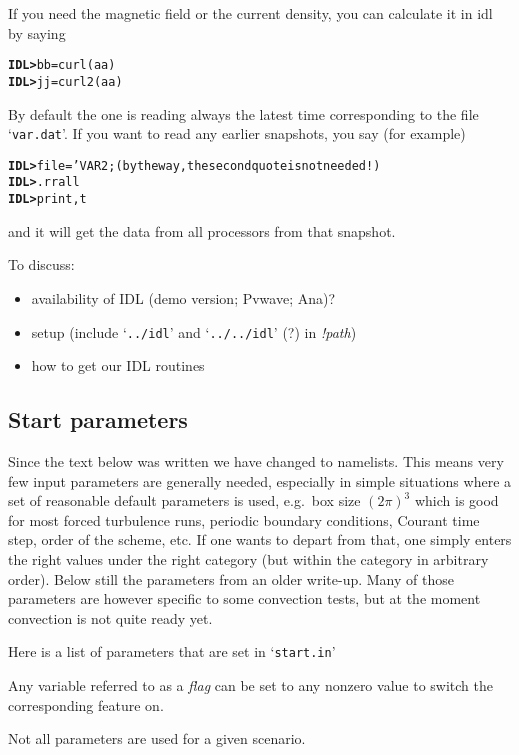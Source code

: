 \documentclass[12pt,twoside,notitlepage,a4paper]{article}
\makeatletter
\newcommand{\prompt}[1]{{\ttfamily\bfseries{}#1}}
\newcommand{\var}[1]{\textsl{#1}\index{#1@\emph{#1}}\/}
\newcommand{\file}[1]{`\texttt{#1}'}
\newcommand{\dfn}[1]{\textsl{#1}\index{#1}\/}
\makeatother
\begin{document}
If you need the magnetic field or the current density, you can calculate
it in idl by saying
\begin{alltt}
  \prompt{IDL> }  bb=curl(aa)
  \prompt{IDL> }  jj=curl2(aa)
\end{alltt}

By default the one is reading always the latest time corresponding to the file
\file{var.dat}. If you want to read any earlier snapshots, you say (for example)
\begin{alltt}
  \prompt{IDL> }  file='VAR2  ;(by the way, the second quote is not needed!)
  \prompt{IDL> }  .r rall
  \prompt{IDL> }  print,t
\end{alltt}
and it will get the data from all processors from that snapshot.

To discuss:
\begin{itemize}
\item availability of IDL (demo version; Pvwave; Ana)?
\item setup (include \file{../idl} and \file{../../idl} (?) in \var{!path})
\item how to get our IDL routines
\end{itemize}


\subsection{Start parameters}

Since the text below was written we have changed to namelists.
This means very few input parameters are generally needed,
especially in simple situations where a set of reasonable
default parameters is used, e.g.\ box size $(2\pi)^3$ which is
good for most forced turbulence runs, periodic boundary
conditions, Courant time step, order of the scheme, etc.
If one wants to depart from that, one simply enters the right
values under the right category (but within the category in
arbitrary order). Below still the parameters from an older
write-up. Many of those parameters are however specific to
some convection tests, but at the moment convection is not
quite ready yet.

\label{start-params}

Here is a list of parameters that are set in \file{start.in}

Any variable referred to as a \dfn{flag} can be set to any nonzero value
to switch the corresponding feature on.

Not all parameters are used for a given scenario.
\end{document}
